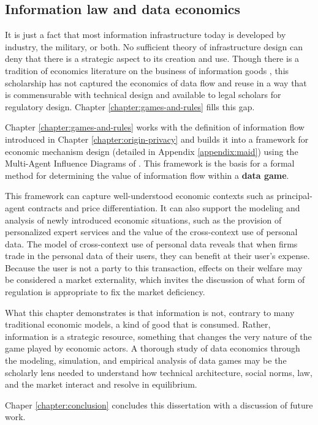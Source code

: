 \documentclass[../thesis.tex]{subfiles}
\begin{document}
 \subsection{Information law and data economics}

 It is just a fact that most information infrastructure
 today is developed by industry, the military, or both.
 No sufficient theory of infrastructure design can
 deny that there is a strategic aspect to its
 creation and use.
 Though there is a tradition of economics literature
 on the business of information goods
\cite{shapiro1998information}
\cite{varian2001economics} \cite{acquisti2016economics},
this scholarship has not captured the economics of data flow
and reuse
in a way that is commensurable with technical design and
available to legal scholars for regulatory design.
Chapter \ref{chapter:games-and-rules} fills this gap.

 Chapter \ref{chapter:games-and-rules} works with the
 definition of information flow introduced in
 Chapter \ref{chapter:origin-privacy} and builds
 it into a framework for economic mechanism design
 (detailed in Appendix \ref{appendix:maid})
 using the Multi-Agent Influence Diagrams
 of \citet{koller2003multi}.
 This framework is the basis for a formal method for
 determining the value of information flow within a
 \textbf{data game}.

 This framework can capture well-understood economic
 contexts such as principal-agent contracts and
 price differentiation.
 It can also support the modeling and analysis of
 newly introduced economic situations, such as the provision
 of personalized expert services and the
 value of the cross-context use of personal data.
 The model of cross-context use of personal data
 reveals that when firms trade in the personal data
 of their users, they can benefit at their user's expense.
 Because the user is not a party to this transaction,
 effects on their welfare may be considered a market externality,
 which invites the discussion of what form of
 regulation is appropriate to fix the market deficiency.

 What this chapter demonstrates is that information
 is not, contrary to many traditional economic models,
 a kind of good that is consumed.
 Rather, information is a strategic resource, something
 that changes the very nature of the game played by
 economic actors.
 A thorough study of data economics through the
 modeling, simulation, and empirical analysis of
 data games may be the scholarly lens needed to
 understand how technical architecture, social norms,
 law, and the market interact and resolve in equilibrium.

 Chaper \ref{chapter:conclusion} concludes this dissertation
 with a discussion of future work.
 
\end{document}
